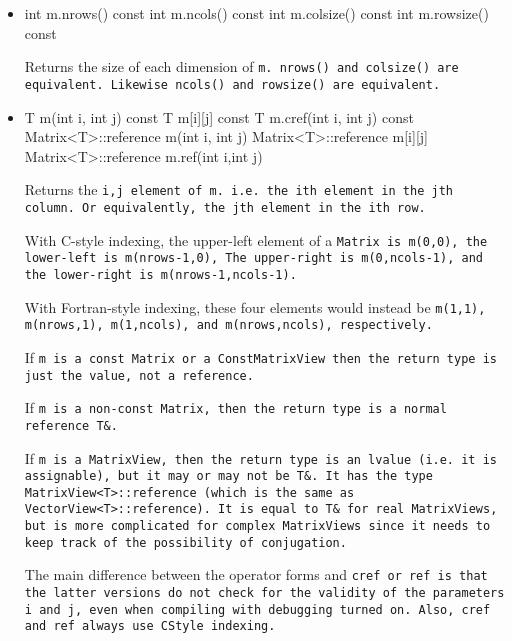 \begin{itemize}
\item
\begin{tmvcode}
int m.nrows() const
int m.ncols() const
int m.colsize() const
int m.rowsize() const
\end{tmvcode}
Returns the size of each dimension of \tt{m}.  \tt{nrows()} and \tt{colsize()} are equivalent.
Likewise \tt{ncols()} and \tt{rowsize()} are equivalent.

\item
\begin{tmvcode}
T m(int i, int j) const
T m[i][j] const
T m.cref(int i, int j) const
Matrix<T>::reference m(int i, int j)
Matrix<T>::reference m[i][j]
Matrix<T>::reference m.ref(int i,int j)
\end{tmvcode}
Returns the \tt{i,j} element of \tt{m}. i.e. the \tt{i}th element in the 
\tt{j}th column.  Or
equivalently, the \tt{j}th element in the \tt{i}th row. 

With C-style indexing, the upper-left element
of a \tt{Matrix} is \tt{m(0,0)}, the lower-left is \tt{m(nrows-1,0)},
The upper-right is \tt{m(0,ncols-1)}, and the lower-right is
\tt{m(nrows-1,ncols-1)}.

With Fortran-style indexing, these four elements would instead be
\tt{m(1,1)}, \tt{m(nrows,1)}, \tt{m(1,ncols)}, and \tt{m(nrows,ncols)},
respectively.

If \tt{m} is a 
\tt{const Matrix} or a \tt{ConstMatrixView}
then the return type is just the value, not a reference.

If \tt{m} is a 
non-\tt{const Matrix}, then the return type is a normal reference \tt{T\&}.

If \tt{m} is a \tt{MatrixView}, then the return type is an lvalue (i.e. it is assignable), but it may or may not be \tt{T\&}.
It has the type \tt{MatrixView<T>::reference}
(which is the same as \tt{VectorView<T>::reference}).
It is equal to \tt{T\&} for real \tt{MatrixView}s, but is
more complicated for complex \tt{MatrixView}s since it needs to 
keep track of the possibility of conjugation.

The main difference between the operator forms and \tt{cref} or \tt{ref} is that the latter versions do not
check for the validity of the parameters \tt{i} and \tt{j}, even when compiling with debugging turned on.
Also, \tt{cref} and \tt{ref} always use \tt{CStyle} indexing.


\end{itemize}
